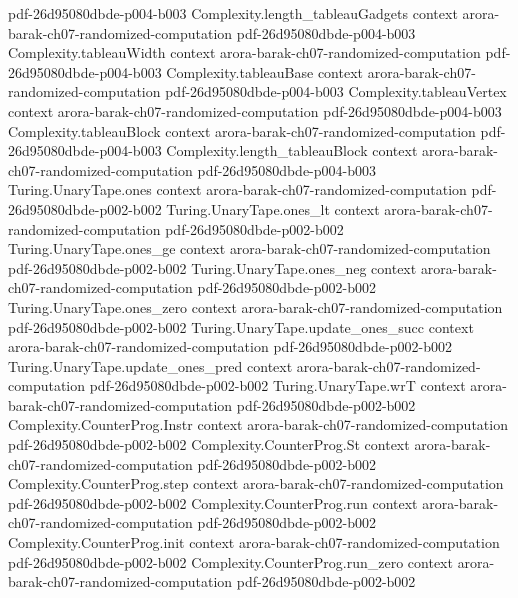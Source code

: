 \begin{theorem}
  {pdf-26d95080dbde-p004-b003}
\proofstep
  {Complexity.length_tableauGadgets}
  {context}
  {arora-barak-ch07-randomized-computation}
  {pdf-26d95080dbde-p004-b003}
\proofstep
  {Complexity.tableauWidth}
  {context}
  {arora-barak-ch07-randomized-computation}
  {pdf-26d95080dbde-p004-b003}
\proofstep
  {Complexity.tableauBase}
  {context}
  {arora-barak-ch07-randomized-computation}
  {pdf-26d95080dbde-p004-b003}
\proofstep
  {Complexity.tableauVertex}
  {context}
  {arora-barak-ch07-randomized-computation}
  {pdf-26d95080dbde-p004-b003}
\proofstep
  {Complexity.tableauBlock}
  {context}
  {arora-barak-ch07-randomized-computation}
  {pdf-26d95080dbde-p004-b003}
\proofstep
  {Complexity.length_tableauBlock}
  {context}
  {arora-barak-ch07-randomized-computation}
  {pdf-26d95080dbde-p004-b003}
\proofstep
  {Turing.UnaryTape.ones}
  {context}
  {arora-barak-ch07-randomized-computation}
  {pdf-26d95080dbde-p002-b002}
\proofstep
  {Turing.UnaryTape.ones_lt}
  {context}
  {arora-barak-ch07-randomized-computation}
  {pdf-26d95080dbde-p002-b002}
\proofstep
  {Turing.UnaryTape.ones_ge}
  {context}
  {arora-barak-ch07-randomized-computation}
  {pdf-26d95080dbde-p002-b002}
\proofstep
  {Turing.UnaryTape.ones_neg}
  {context}
  {arora-barak-ch07-randomized-computation}
  {pdf-26d95080dbde-p002-b002}
\proofstep
  {Turing.UnaryTape.ones_zero}
  {context}
  {arora-barak-ch07-randomized-computation}
  {pdf-26d95080dbde-p002-b002}
\proofstep
  {Turing.UnaryTape.update_ones_succ}
  {context}
  {arora-barak-ch07-randomized-computation}
  {pdf-26d95080dbde-p002-b002}
\proofstep
  {Turing.UnaryTape.update_ones_pred}
  {context}
  {arora-barak-ch07-randomized-computation}
  {pdf-26d95080dbde-p002-b002}
\proofstep
  {Turing.UnaryTape.wrT}
  {context}
  {arora-barak-ch07-randomized-computation}
  {pdf-26d95080dbde-p002-b002}
\proofstep
  {Complexity.CounterProg.Instr}
  {context}
  {arora-barak-ch07-randomized-computation}
  {pdf-26d95080dbde-p002-b002}
\proofstep
  {Complexity.CounterProg.St}
  {context}
  {arora-barak-ch07-randomized-computation}
  {pdf-26d95080dbde-p002-b002}
\proofstep
  {Complexity.CounterProg.step}
  {context}
  {arora-barak-ch07-randomized-computation}
  {pdf-26d95080dbde-p002-b002}
\proofstep
  {Complexity.CounterProg.run}
  {context}
  {arora-barak-ch07-randomized-computation}
  {pdf-26d95080dbde-p002-b002}
\proofstep
  {Complexity.CounterProg.init}
  {context}
  {arora-barak-ch07-randomized-computation}
  {pdf-26d95080dbde-p002-b002}
\proofstep
  {Complexity.CounterProg.run_zero}
  {context}
  {arora-barak-ch07-randomized-computation}
  {pdf-26d95080dbde-p002-b002}

\end{theorem}
